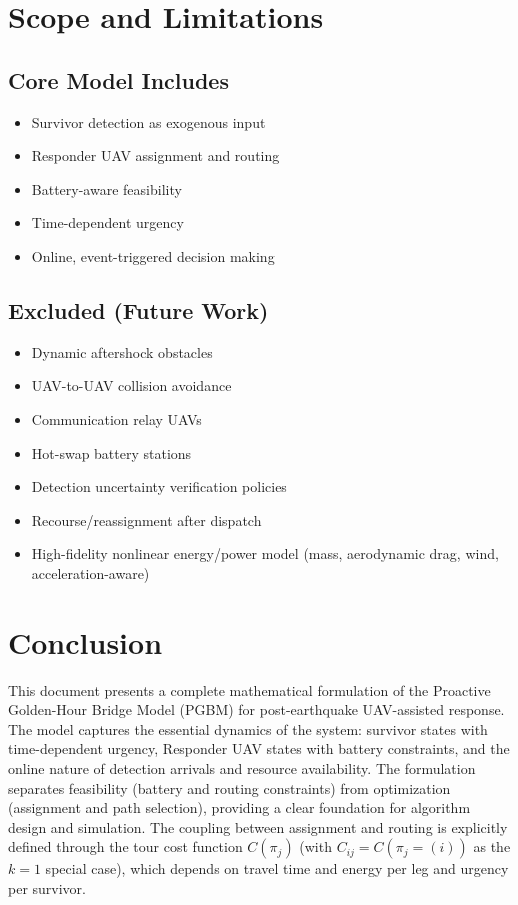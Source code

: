 \documentclass[conference]{IEEEtran}
\begin{document}
\section{Scope and Limitations}

\subsection{Core Model Includes}
\begin{itemize}
\item Survivor detection as exogenous input
\item Responder UAV assignment and routing
\item Battery-aware feasibility
\item Time-dependent urgency
\item Online, event-triggered decision making
\end{itemize}

\subsection{Excluded (Future Work)}
\begin{itemize}
\item Dynamic aftershock obstacles
\item UAV-to-UAV collision avoidance
\item Communication relay UAVs
\item Hot-swap battery stations
\item Detection uncertainty verification policies
\item Recourse/reassignment after dispatch
\item High-fidelity nonlinear energy/power model (mass, aerodynamic drag, wind, acceleration-aware)
\end{itemize}

\section{Conclusion}
This document presents a complete mathematical formulation of the Proactive Golden-Hour Bridge Model (PGBM) for post-earthquake UAV-assisted response. The model captures the essential dynamics of the system: survivor states with time-dependent urgency, Responder UAV states with battery constraints, and the online nature of detection arrivals and resource availability. The formulation separates feasibility (battery and routing constraints) from optimization (assignment and path selection), providing a clear foundation for algorithm design and simulation. The coupling between assignment and routing is explicitly defined through the tour cost function $C(\pi_j)$ (with $C_{ij}=C(\pi_j=(i))$ as the $k=1$ special case), which depends on travel time and energy per leg and urgency per survivor.
\end{document}
